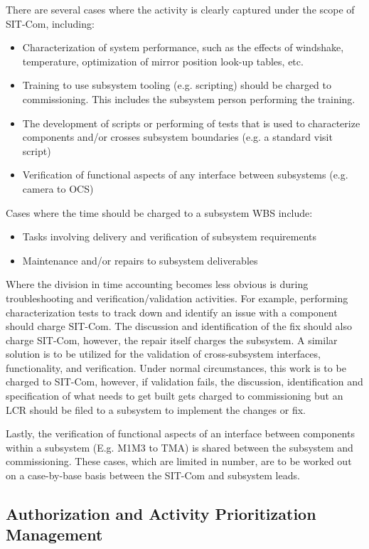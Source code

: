 \documentclass[SE,lsstdraft,authoryear,toc]{lsstdoc}
\begin{document}
There are several cases where the activity is clearly captured under the scope of SIT-Com, including:
\begin{itemize}
    \item Characterization of system performance, such as the effects of windshake, temperature, optimization of mirror position look-up tables, etc.
    \item Training to use subsystem tooling (e.g. scripting) should be charged to commissioning. This includes the subsystem person performing the training.
    \item The development of scripts or performing of tests that is used to characterize components and/or crosses subsystem boundaries (e.g. a standard visit script)
    \item Verification of functional aspects of any interface between subsystems (e.g. camera to OCS)
\end{itemize}

Cases where the time should be charged to a subsystem WBS include:
\begin{itemize}
    \item Tasks involving delivery and verification of subsystem requirements
    \item Maintenance and/or repairs to subsystem deliverables
\end{itemize}


Where the division in time accounting becomes less obvious is during troubleshooting and verification/validation activities.
For example, performing characterization tests to track down and identify an issue with a component should charge SIT-Com.
The discussion and identification of the fix should also charge SIT-Com, however, the repair itself charges the subsystem.
A similar solution is to be utilized for the validation of cross-subsystem interfaces, functionality, and verification.
Under normal circumstances, this work is to be charged to SIT-Com, however, if validation fails, the discussion, identification and specification of what needs to get built gets charged to commissioning but an LCR should be filed to a subsystem to implement the changes or fix.

Lastly, the verification of functional aspects of an interface between components within a subsystem (E.g. M1M3 to TMA) is shared between the subsystem and commissioning.
These cases, which are limited in number, are to be worked out on a case-by-base basis between the SIT-Com and subsystem leads.

\subsection{Authorization and Activity Prioritization Management}
\end{document}
